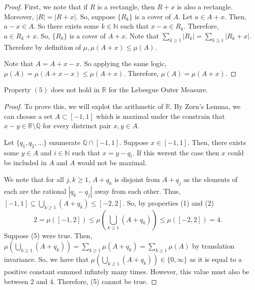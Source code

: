 \documentclass{amsart}
\theoremstyle{definition}
\numberwithin{equation}{section}
\newcommand{\sm}{\setminus}
\newcommand{\s}[1]{\{#1\}}
\newcommand{\N}{\mathbb{N}}
\newcommand{\R}{\mathbb{R}}
\newcommand{\Q}{\mathbb{Q}}
\begin{document}
    \begin{proof}

      First, we note that if $R$ is a rectangle, then $R + x$ is also a rectangle. Moreover, $|R| = |R + x|.$ So, suppose $\s{R_k}$ is a cover of $A.$ Let $a \in A + x.$ Then, $a - x \in A.$ So there exists some $k \in \N$ such that $x - a \in R_k.$ Therefore, $a \in R_k + x.$ So, $\s{R_k}$ is a cover of $A + x.$ Note that $\sum_{k\geq1}|R_k| = \sum_{k\geq1}|R_k + x|.$ Therefore by definition of $\mu, \mu(A + x) \leq \mu(A).$

      Note that $A = A + x - x.$ So applying the same logic, $\mu(A) = \mu(A + x - x) \leq \mu(A + x).$ Therefore, $\mu(A) = \mu(A + x).$

    \end{proof}

  \begin{theorem}

    Property $(5)$ does not hold in $\R$ for the Lebesgue Outer Measure.

  \end{theorem}

    \begin{proof}

      To prove this, we will explot the arithmetic of $\R.$ By Zorn's Lemma, we can choose a set $A \subset [-1, 1]$ which is maximal under the constrain that $x - y \in \R \sm \Q$ for every distrinct pair $x, y \in A.$

      Let $\s{q_1, q_2, \ldots}$ enumerate $\Q \cap [-1, 1].$ Suppose $x \in [-1, 1].$ Then, there exists some $y \in A$ and $i \in \N$ such that $x = y - q_i.$ If this werent the case then $x$ could be included in $A$ and $A$ would not be maximal.

      We note that for all $j, k \geq 1$, $A + q_k$ is disjoint from $A + q_j$ as the elements of each are the rational $|q_k - q_j|$ away from each other. Thus, $[-1, 1] \subseteq \bigcup_{k\geq1}(A + q_k) \leq [-2, 2].$
      So, by properties (1) and (2) \[2 = \mu([-1, 2]) \leq \mu(\bigcup_{k\geq1}(A + q_k)) \leq \mu([-2, 2]) = 4.\]
      Suppose (5) were true. Then, $\mu(\bigcup_{k\geq1}(A + q_k)) = \sum_{k\geq1}\mu(A + q_k) = \sum_{k\geq1}\mu(A)$ by translation invariance.
      So, we have that $\mu(\bigcup_{k\geq1}(A + q_k)) \in \s{0, \infty}$ as it is equal to a positive constant summed infintely many times.
      However, this value must also be between 2 and 4. Therefore, (5) cannot be true.

    \end{proof}
\end{document}
